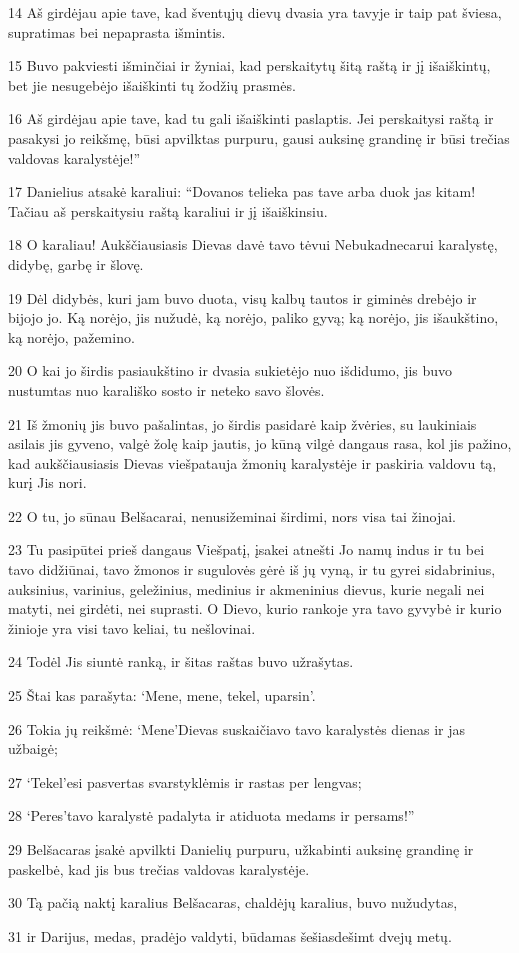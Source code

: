 \par 14 Aš girdėjau apie tave, kad šventųjų dievų dvasia yra tavyje ir taip pat šviesa, supratimas bei nepaprasta išmintis. 
\par 15 Buvo pakviesti išminčiai ir žyniai, kad perskaitytų šitą raštą ir jį išaiškintų, bet jie nesugebėjo išaiškinti tų žodžių prasmės. 
\par 16 Aš girdėjau apie tave, kad tu gali išaiškinti paslaptis. Jei perskaitysi raštą ir pasakysi jo reikšmę, būsi apvilktas purpuru, gausi auksinę grandinę ir būsi trečias valdovas karalystėje!” 
\par 17 Danielius atsakė karaliui: “Dovanos telieka pas tave arba duok jas kitam! Tačiau aš perskaitysiu raštą karaliui ir jį išaiškinsiu. 
\par 18 O karaliau! Aukščiausiasis Dievas davė tavo tėvui Nebukadnecarui karalystę, didybę, garbę ir šlovę. 
\par 19 Dėl didybės, kuri jam buvo duota, visų kalbų tautos ir giminės drebėjo ir bijojo jo. Ką norėjo, jis nužudė, ką norėjo, paliko gyvą; ką norėjo, jis išaukštino, ką norėjo, pažemino. 
\par 20 O kai jo širdis pasiaukštino ir dvasia sukietėjo nuo išdidumo, jis buvo nustumtas nuo karališko sosto ir neteko savo šlovės. 
\par 21 Iš žmonių jis buvo pašalintas, jo širdis pasidarė kaip žvėries, su laukiniais asilais jis gyveno, valgė žolę kaip jautis, jo kūną vilgė dangaus rasa, kol jis pažino, kad aukščiausiasis Dievas viešpatauja žmonių karalystėje ir paskiria valdovu tą, kurį Jis nori. 
\par 22 O tu, jo sūnau Belšacarai, nenusižeminai širdimi, nors visa tai žinojai. 
\par 23 Tu pasipūtei prieš dangaus Viešpatį, įsakei atnešti Jo namų indus ir tu bei tavo didžiūnai, tavo žmonos ir sugulovės gėrė iš jų vyną, ir tu gyrei sidabrinius, auksinius, varinius, geležinius, medinius ir akmeninius dievus, kurie negali nei matyti, nei girdėti, nei suprasti. O Dievo, kurio rankoje yra tavo gyvybė ir kurio žinioje yra visi tavo keliai, tu nešlovinai. 
\par 24 Todėl Jis siuntė ranką, ir šitas raštas buvo užrašytas. 
\par 25 Štai kas parašyta: ‘Mene, mene, tekel, uparsin’. 
\par 26 Tokia jų reikšmė: ‘Mene’­Dievas suskaičiavo tavo karalystės dienas ir jas užbaigė; 
\par 27 ‘Tekel’­esi pasvertas svarstyklėmis ir rastas per lengvas; 
\par 28 ‘Peres’­tavo karalystė padalyta ir atiduota medams ir persams!” 
\par 29 Belšacaras įsakė apvilkti Danielių purpuru, užkabinti auksinę grandinę ir paskelbė, kad jis bus trečias valdovas karalystėje. 
\par 30 Tą pačią naktį karalius Belšacaras, chaldėjų karalius, buvo nužudytas, 
\par 31 ir Darijus, medas, pradėjo valdyti, būdamas šešiasdešimt dvejų metų.



